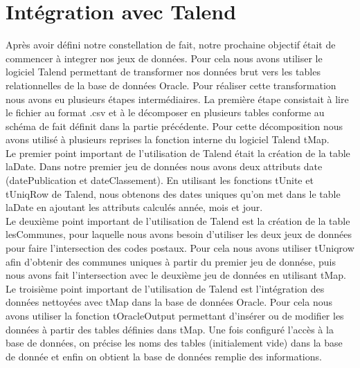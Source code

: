 \documentclass[a4paper,sffamily,12pt]{article}
\begin{document}
		\vspace{0.5cm}
				
	\section{Intégration avec Talend}

		\vspace{0.5cm}
		
		Après avoir défini notre constellation de fait, notre prochaine objectif était de commencer à integrer nos jeux de données. Pour cela nous avons utiliser le logiciel Talend permettant de transformer nos données brut vers les tables relationnelles de la base de données Oracle. Pour réaliser cette transformation nous avons eu plusieurs étapes intermédiaires. La première étape consistait à lire le fichier au format .csv et à le décomposer en plusieurs tables conforme au schéma de fait définit dans la partie précédente. Pour cette décomposition nous avons utilisé à plusieurs reprises la fonction interne du logiciel Talend tMap. \\
		
    		\indent Le premier point important de l’utilisation de Talend était la création de la table laDate. Dans notre premier jeu de données nous avons deux attributs date (datePublication et dateClassement). En utilisant les fonctions tUnite et tUniqRow de Talend, nous obtenons des dates uniques qu’on met dans le table laDate en ajoutant les attributs calculés année, mois et jour. \\
    		
    		\indent Le deuxième point important de l’utilisation de Talend est la création de la table lesCommunes, pour laquelle nous avons besoin d’utiliser les deux jeux de données pour faire l’intersection des codes postaux. Pour cela nous avons utiliser tUniqrow afin d'obtenir des communes uniques à partir du premier jeu de donnése, puis nous avons fait l’intersection avec le deuxième jeu de données en utilisant tMap. \\
    		
    		\indent Le troisième point important de l’utilisation de Talend est l’intégration des données nettoyées avec tMap dans la base de données Oracle. Pour cela nous avons utiliser la fonction tOracleOutput permettant d'insérer ou de modifier les données à partir des tables définies dans tMap. Une fois configuré l’accès à la base de données, on précise les noms des tables (initialement vide) dans la base de donnée et enfin on obtient la base de données remplie des informations. \\		
		
\end{document}

